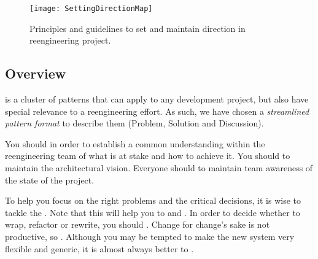 \documentclass[a4paper,10pt,twoside]{book}
\begin{document}
\begin{figure}
\begin{center}
\texttt{[image: SettingDirectionMap]}
\caption{Principles and guidelines to set and maintain direction in reengineering project.}
\end{center}
\end{figure}

\subsection*{Overview}

 is a cluster of patterns that can apply to any development project, but also have special relevance to a reengineering effort. As such, we have chosen a \emph{streamlined pattern format} to describe them (Problem, Solution and Discussion).

You should  in order to establish a common understanding within the reengineering team of what is at stake and how to achieve it. You should  to maintain the architectural vision. Everyone should  to maintain team awareness of the state of the project.

To help you focus on the right problems and the critical decisions, it is wise to tackle the . Note that this will help you to  and . In order to decide whether to wrap, refactor or rewrite, you should . Change for change's sake is not productive, so . Although you may be tempted to make the new system very flexible and generic, it is almost always better to .



\end{document}
